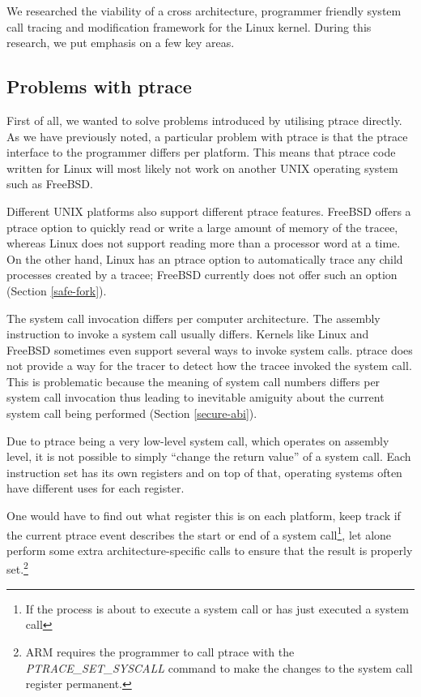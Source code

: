 \documentclass[a4paper, 10pt]{report}
\begin{document}
We researched the viability of a cross architecture, programmer friendly
system call tracing and modification framework for the Linux kernel.
During this research, we put emphasis on a few key areas.

\subsection{Problems with ptrace}
First of all, we wanted to solve problems introduced by utilising ptrace
directly. As we have previously noted, a particular problem with ptrace is that
the ptrace interface to the programmer differs per platform. This means that
ptrace code written for Linux will most likely not work on another UNIX operating
system such as FreeBSD.

Different UNIX platforms also support different ptrace features. FreeBSD offers
a ptrace option to quickly read or write a large amount of memory of the
tracee, whereas Linux does not support reading more than a processor word at a
time. On the other hand, Linux has an ptrace option to automatically trace
any child processes created by a tracee; FreeBSD currently does not offer such
an option (Section \ref{safe-fork}). %

The system call invocation differs per computer architecture.
The assembly instruction to invoke a system call usually differs.
Kernels like Linux and FreeBSD sometimes even support several ways to invoke
system calls. ptrace does not provide a way for the tracer to detect how
the tracee invoked the system call. This is problematic because the meaning
of system call numbers differs per system call invocation thus leading to
inevitable amiguity about the current system call being performed (Section
\ref{secure-abi}).

Due to ptrace being a very low-level system call, which operates on assembly
level, it is not possible to simply ``change the return value'' of a system
call. Each instruction set has its own registers and on top of that, operating
systems often have different uses for each register.

One would have to find out what register this is on each platform,
keep track if the current ptrace event describes the start or end of a system
call\footnote{If the process is about to execute a system call or has just
executed a system call}, let alone perform some extra architecture-specific
calls to ensure that the result is properly set.\footnote{ARM requires
the programmer to call ptrace with the \textit{PTRACE\_SET\_SYSCALL} command
to make the changes to the system call register permanent.}
\end{document}
